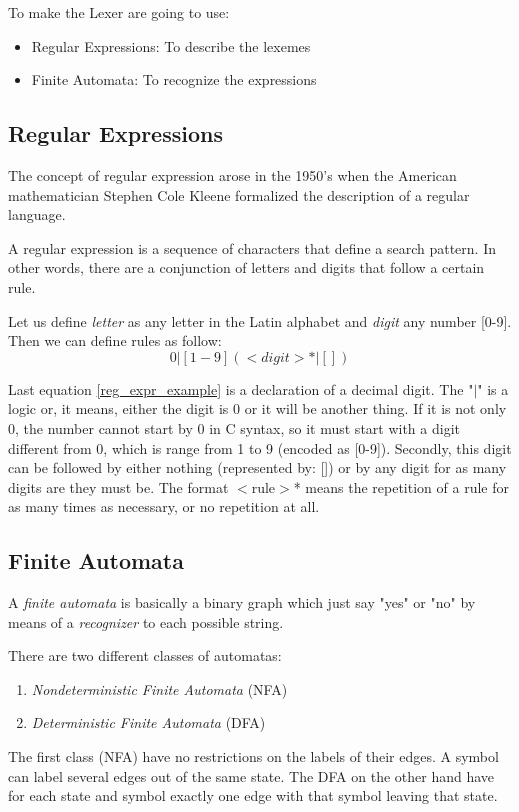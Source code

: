\documentclass[conference]{IEEEtran}
\theoremstyle{definition}
\begin{document}
To make the Lexer are going to use:
\begin{itemize}
	\item Regular Expressions: To describe the lexemes
	\item Finite Automata: To recognize the expressions
\end{itemize}
\subsection{Regular Expressions}
The concept of regular expression arose in the 1950's when the American mathematician Stephen Cole Kleene formalized the description of a regular language.

A regular expression is a sequence of characters that define a search pattern. In other words, there are a conjunction of letters and digits that follow a certain rule.

Let us define \textit{letter} as any letter in the Latin alphabet and \textit{digit} any number [0-9]. Then we can define rules as follow: 
\begin{equation}
0 | [1-9] (<digit>* | [])\label{reg_expr_example}
\end{equation}

Last equation \ref{reg_expr_example} is a declaration of a decimal digit. The "$|$" is a logic or, it means, either the digit is 0 or it will be another thing. If it is not only 0, the number cannot start by 0 in C syntax, so it must start with a digit different from 0, which is range from 1 to 9 (encoded as [0-9]). Secondly, this digit can be followed by either nothing (represented by: []) or by any digit for as many digits are they must be. The format $<$rule$>$* means the repetition of a rule for as many times as necessary, or no repetition at all.

\subsection{Finite Automata}
A \textit{finite automata} is basically a binary graph which just say "yes" or "no" by means of a \textit{recognizer} to each possible string.

There are two different classes of automatas:
\begin{enumerate}
	\item \textit{Nondeterministic Finite Automata} (NFA)
	\item \textit{Deterministic Finite Automata} (DFA)
\end{enumerate}
The first class (NFA) have no restrictions on the labels of their edges. A symbol can label several edges out of the same state. The DFA on the other hand have for each state and symbol exactly one edge with that symbol leaving that state. 
\end{document}
